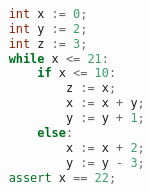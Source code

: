 \begin{lstlisting}[language=C++,basicstyle=\ttfamily,keywordstyle=\color{blue}]  % Start your code-block
	
	int x := 0;
	int y := 2;
	int z := 3;
	while x <= 21:
		if x <= 10:
			z := x;
			x := x + y;
			y := y + 1;
		else:
			x := x + 2;
			y := y - 3;
	assert x == 22;
	\end{lstlisting}